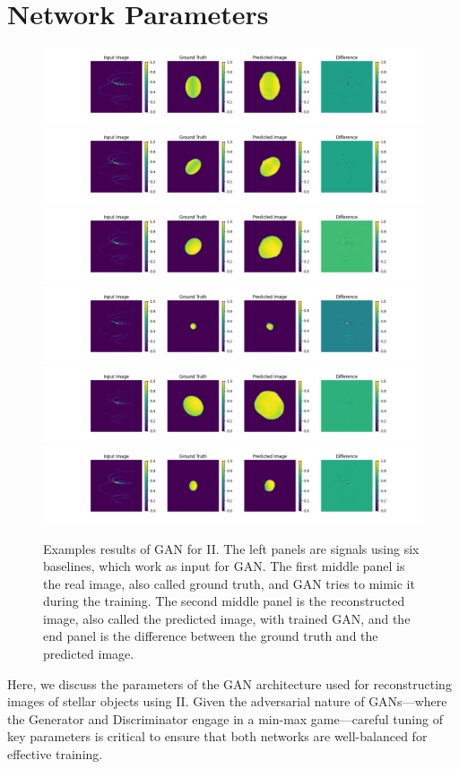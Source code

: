 \section{Network Parameters}
\begin{figure}
	\centering
	\includegraphics[width=\linewidth]{fig/testing_image/image_3.png}
	\includegraphics[width=\linewidth]{fig/testing_image/image_14.png}
	\includegraphics[width=\linewidth]{fig/testing_image/image_5.png}
	\includegraphics[width=\linewidth]{fig/testing_image/image_6.png}
	\includegraphics[width=\linewidth]{fig/testing_image/image_13.png}
	\includegraphics[width=\linewidth]{fig/testing_image/image_42.png}
\caption{Examples results of GAN for II. The left panels are signals using six baselines, which work as input for GAN. The first middle panel is the real image, also called ground truth, and GAN tries to mimic it during the training. The second middle panel is the reconstructed image, also called the predicted image, with trained GAN, and the end panel is the difference between the ground truth and the predicted image.}
	\label{fig:GAN}
\end{figure}
Here, we discuss the parameters of the GAN architecture used for reconstructing images of stellar objects using II. Given the adversarial nature of GANs—where the Generator and Discriminator engage in a min-max game—careful tuning of key parameters is critical to ensure that both networks are well-balanced for effective training.

